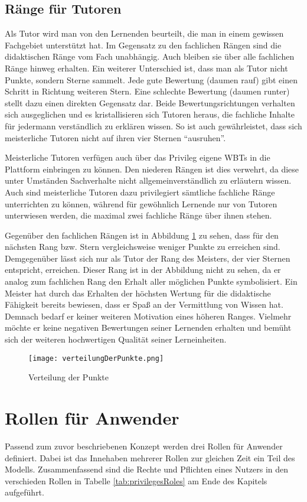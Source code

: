 \subsection{Ränge für Tutoren}\label{ref:rankTeach}
Als Tutor wird man von den Lernenden beurteilt, die man in einem gewissen
Fachgebiet unterstützt hat. Im Gegensatz zu den fachlichen Rängen sind die
didaktischen Ränge vom Fach unabhängig. Auch bleiben sie über alle fachlichen
Ränge hinweg erhalten. Ein weiterer Unterschied ist, dass man als Tutor nicht
Punkte, sondern Sterne sammelt. Jede gute Bewertung (daumen rauf) gibt einen
Schritt in Richtung weiteren Stern. Eine schlechte Bewertung (daumen runter)
stellt dazu einen direkten Gegensatz dar. Beide Bewertungsrichtungen verhalten
sich ausgeglichen und es kristallisieren sich Tutoren heraus, die fachliche
Inhalte für jedermann verständlich zu erklären wissen. So ist auch
gewährleistet, dass sich meisterliche Tutoren nicht auf ihren vier Sternen
"`ausruhen"'. 

Meisterliche Tutoren verfügen auch über das Privileg eigene WBTs in die
Plattform einbringen zu können. Den niederen Rängen ist dies verwehrt, da diese
unter Umständen Sachverhalte nicht allgemeinverständlich zu erläutern wissen.
Auch sind meisterliche Tutoren dazu privilegiert sämtliche fachliche Ränge
unterrichten zu können, während für gewöhnlich Lernende nur von Tutoren
unterwiesen werden, die maximal zwei fachliche Ränge über ihnen stehen.

Gegenüber den fachlichen Rängen ist in Abbildung \ref{ref:vertPunkt} zu sehen,
dass für den nächsten Rang bzw. Stern vergleichsweise weniger Punkte zu
erreichen sind. Demgegenüber lässt sich nur als Tutor der Rang des Meisters, der
vier Sternen entspricht, erreichen. Dieser Rang ist in der Abbildung nicht zu
sehen, da er analog zum fachlichen Rang den Erhalt aller möglichen Punkte
symbolisiert. Ein Meister hat durch das Erhalten der höchsten Wertung für die
didaktische Fähigkeit bereits bewiesen, dass er Spaß an der Vermittlung von
Wissen hat. Demnach bedarf er keiner weiteren Motivation eines höheren Ranges.
Vielmehr möchte er keine negativen Bewertungen seiner Lernenden erhalten und
bemüht sich der weiteren hochwertigen Qualität seiner Lerneinheiten.

\begin{figure}[H]
\texttt{[image: verteilungDerPunkte.png]}
\caption{Verteilung der Punkte}\label{ref:vertPunkt}
\end{figure}

\section{Rollen für Anwender}
Passend zum zuvor beschriebenen Konzept werden drei Rollen für Anwender
definiert. Dabei ist das Innehaben mehrerer Rollen zur gleichen Zeit ein Teil
des Modells. Zusammenfassend sind die Rechte und Pflichten eines Nutzers in den
verschieden Rollen in Tabelle \ref{tab:privilegesRoles} am Ende des
Kapitels aufgeführt.

